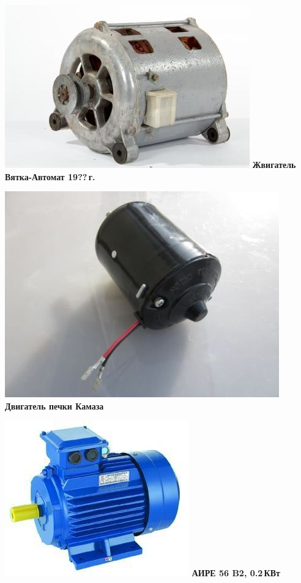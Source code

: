 {\begin{multicols}{2}
\noindent\includegraphics[width=\columnwidth]{00/fig/VyatkaDvig.jpg}
\textbf{Жвигатель Вятка-Автомат 19??\,г.}

\noindent\includegraphics[width=\columnwidth]{00/fig/KamazDvig.jpg}
\textbf{Двигатель печки Камаза}

\noindent\includegraphics[width=\columnwidth]{00/fig/AIRE.jpg}
\textbf{АИРЕ 56 B2, 0.2\,КВт}


\end{multicols}}
